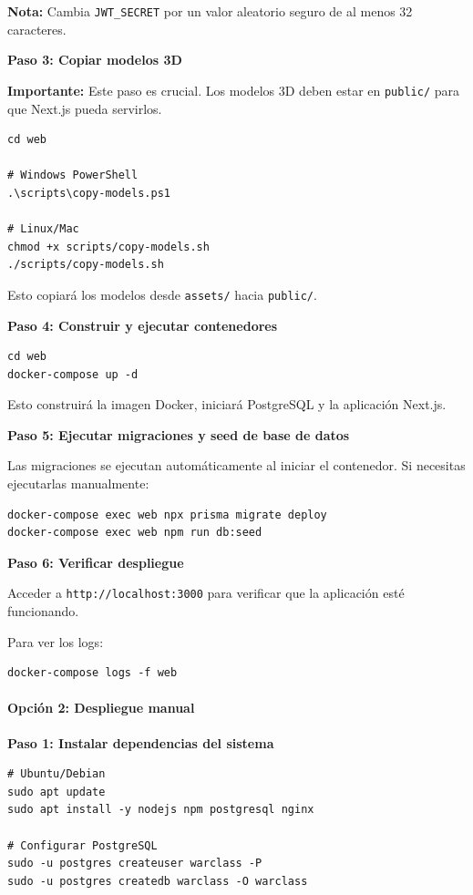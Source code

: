 \textbf{Nota:} Cambia \texttt{JWT\_SECRET} por un valor aleatorio seguro de al menos 32 caracteres.

\textbf{Paso 3: Copiar modelos 3D}

\textbf{Importante:} Este paso es crucial. Los modelos 3D deben estar en \texttt{public/} para que Next.js pueda servirlos.

\begin{verbatim}
cd web

# Windows PowerShell
.\scripts\copy-models.ps1

# Linux/Mac
chmod +x scripts/copy-models.sh
./scripts/copy-models.sh
\end{verbatim}

Esto copiará los modelos desde \texttt{assets/} hacia \texttt{public/}.

\textbf{Paso 4: Construir y ejecutar contenedores}

\begin{verbatim}
cd web
docker-compose up -d
\end{verbatim}

Esto construirá la imagen Docker, iniciará PostgreSQL y la aplicación Next.js.

\textbf{Paso 5: Ejecutar migraciones y seed de base de datos}

Las migraciones se ejecutan automáticamente al iniciar el contenedor. Si necesitas ejecutarlas manualmente:

\begin{verbatim}
docker-compose exec web npx prisma migrate deploy
docker-compose exec web npm run db:seed
\end{verbatim}

\textbf{Paso 6: Verificar despliegue}

Acceder a \texttt{http://localhost:3000} para verificar que la aplicación esté funcionando.

Para ver los logs:

\begin{verbatim}
docker-compose logs -f web
\end{verbatim}

\paragraph{Opción 2: Despliegue manual}

\textbf{Paso 1: Instalar dependencias del sistema}

\begin{verbatim}
# Ubuntu/Debian
sudo apt update
sudo apt install -y nodejs npm postgresql nginx

# Configurar PostgreSQL
sudo -u postgres createuser warclass -P
sudo -u postgres createdb warclass -O warclass
\end{verbatim}

